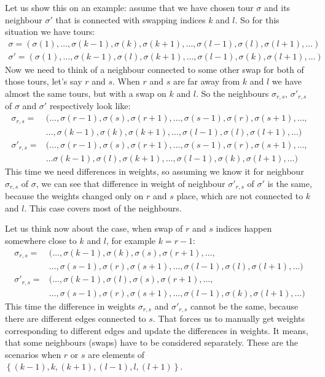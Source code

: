 		Let us show this on an example: assume that we have chosen tour $\sigma$ and its neighbour $\sigma'$ that is connected with swapping indices $k$ and $l$. So for this situation we have tours:
		\begin{align*}
			\sigma = (\sigma(1), \ldots, \sigma(k-1), \sigma(k), \sigma(k+1), \ldots, \sigma(l-1), \sigma(l), \sigma(l+1), \ldots) \\
			\sigma' = (\sigma(1), \ldots, \sigma(k-1), \sigma(l), \sigma(k+1), \ldots, \sigma(l-1), \sigma(k), \sigma(l+1), \ldots)
		\end{align*}
		Now we need to think of a neighbour connected to some other swap for both of those tours, let's say $r$ and $s$. When $r$ and $s$ are far away from $k$ and $l$ we have almost the same tours, but with a swap on $k$ and $l$. So the neighbours $\sigma_{r,s}$, $\sigma'_{r,s}$ of $\sigma$ and $\sigma'$ respectively look like: 
		\begin{align*}
			\sigma_{r,s} = &(\ldots, \sigma(r-1), \sigma(s), \sigma(r+1), \ldots, \sigma(s-1), \sigma(r),\sigma(s+1), \ldots, \\
			&\ldots, \sigma(k-1), \sigma(k), \sigma(k+1), \ldots, \sigma(l-1), \sigma(l), \sigma(l+1), \ldots) \\
			\sigma'_{r,s} = &(\ldots, \sigma(r-1), \sigma(s), \sigma(r+1), \ldots, \sigma(s-1), \sigma(r), \sigma(s+1), \ldots, \\
			&\ldots \sigma(k-1), \sigma(l), \sigma(k+1), \ldots, \sigma(l-1), \sigma(k), \sigma(l+1), \ldots)
		\end{align*}
		This time we need differences in weights, so assuming we know it for neighbour $\sigma_{r,s}$ of $\sigma$, we can see that difference in weight of neighbour $\sigma'_{r,s}$ of $\sigma'$ is the same, because the weights changed only on $r$ and $s$ place, which are not connected to $k$ and $l$. This case covers most of the neighbours. 
		
		Let us think now about the case, when swap of $r$ and $s$ indices happen somewhere close to $k$ and $l$, for example $k = r-1$:
		\begin{align*}
			\sigma_{r,s} = &(\ldots, \sigma(k-1), \sigma(k), \sigma(s), \sigma(r+1), \ldots, \\
			&\ldots, \sigma(s-1), \sigma(r), \sigma(s+1), \ldots, \sigma(l-1), \sigma(l), \sigma(l+1), \ldots) \\
			\sigma'_{r,s} = &(\ldots, \sigma(k-1), \sigma(l), \sigma(s), \sigma(r+1), \ldots, \\
			& \ldots, \sigma(s-1), \sigma(r), \sigma(s+1), \ldots, \sigma(l-1), \sigma(k), \sigma(l+1), \ldots)
		\end{align*}
		This time the difference in weights $\sigma_{r,s}$ and $\sigma'_{r,s}$ cannot be the same, because there are different edges connected to $s$. That forces us to manually get weights corresponding to different edges and update the differences in weights. It means, that some neighbours (swaps) have to be considered separately. These are the scenarios when $r$ or $s$ are elements of $\left\{ (k-1), k, (k+1), (l-1), l, (l+1) \right\}$.
		
